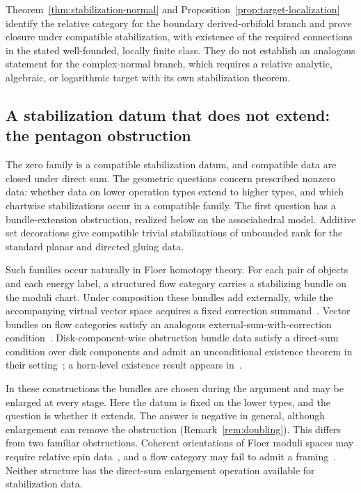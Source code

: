 \documentclass[11pt,letterpaper,twoside]{article}
\theoremstyle{plain}
\theoremstyle{definition}
\theoremstyle{remark}
\let\cite\citep
\begin{document}
Theorem~\ref{thm:stabilization-normal} and Proposition~\ref{prop:target-localization} identify the relative category for the boundary derived-orbifold branch and prove closure under compatible stabilization, with existence of the required connections in the stated well-founded, locally finite class.  They do not establish an analogous statement for the complex-normal branch, which requires a relative analytic, algebraic, or logarithmic target with its own stabilization theorem.

\subsection{A stabilization datum that does not extend: the pentagon obstruction}\label{sec:stabilization-data}

The zero family is a compatible stabilization datum, and compatible data are closed under direct sum.  The geometric questions concern prescribed nonzero data: whether data on lower operation types extend to higher types, and which chartwise stabilizations occur in a compatible family.  The first question has a bundle-extension obstruction, realized below on the associahedral model.  Additive set decorations give compatible trivial stabilizations of unbounded rank for the standard planar and directed gluing data.

Such families occur naturally in Floer homotopy theory.  For each pair of objects and each energy label, a structured flow category carries a stabilizing bundle on the moduli chart.  Under composition these bundles add externally, while the accompanying virtual vector space acquires a fixed correction summand~\cite[Defs.~2.35, 3.8]{abouzaidblumberg2024}.  Vector bundles on flow categories satisfy an analogous external-sum-with-correction condition~\cite[Def.~2.32]{blakeyporcelli2026}.  Disk-component-wise obstruction bundle data satisfy a direct-sum condition over disk components and admit an unconditional existence theorem in their setting~\cite[Def.~5.1, Thm.~5.4]{fooo2020}; a horn-level existence result appears in~\cite[Prop.~5.12]{abouzaidblumberg2024}.

In these constructions the bundles are chosen during the argument and may be enlarged at every stage.  Here the datum is fixed on the lower types, and the question is whether it extends.  The answer is negative in general, although enlargement can remove the obstruction (Remark~\ref{rem:doubling}).  This differs from two familiar obstructions.  Coherent orientations of Floer moduli spaces may require relative spin data~\cite{fooo2009,ekholmetnyresullivan2005}, and a flow category may fail to admit a framing~\cite{cohenjonessegal1995,cohen2020floer}.  Neither structure has the direct-sum enlargement operation available for stabilization data.
\end{document}
